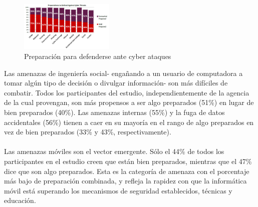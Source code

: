 \documentclass[journal]{IEEEtran}
\begin{document}
\begin{figure}[htb]
\centering
\includegraphics[width=0.4\textwidth]{img2.png}
\caption{Preparación para defenderse ante cyber ataques}%
\end{figure}

Las amenazas de ingeniería social- engañando a un usuario de computadora a tomar algún tipo de decisión o divulgar información- son más difíciles de combatir. Todos los participantes del estudio, independientemente de la agencia de la cual provengan, son más propensos a ser algo preparados (51\%) en lugar de bien preparados (40\%). Las amenazas internas (55\%) y la fuga de datos accidentales (56\%) tienen a caer en su mayoría en el rango de algo preparados en vez de bien preparados (33\% y 43\%, respectivamente).\\ \\
Las amenazas móviles son el vector emergente. Sólo el 44\% de todos los participantes en el estudio creen que están bien preparados, mientras que el 47\% dice que son algo preparados. Esta es la categoría de amenaza con el porcentaje más bajo de preparación combinada, y refleja la rapidez con que la informática móvil está superando los mecanismos de seguridad establecidos, técnicas y educación.
\end{document}
